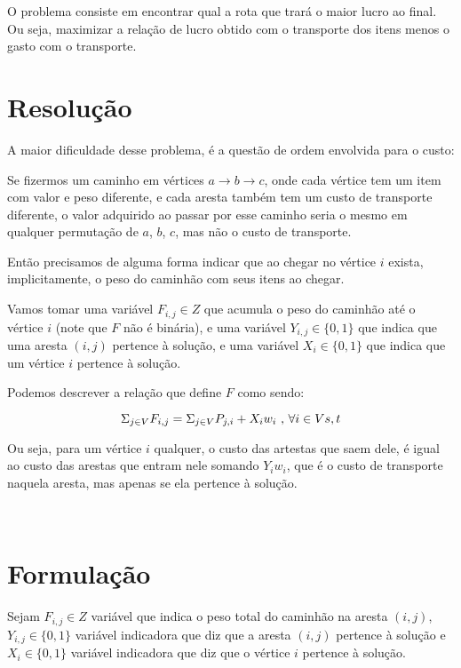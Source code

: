 \documentclass[conference]{IEEEtran}
\begin{document}
    O problema consiste em encontrar qual a rota que trará o maior lucro ao final. Ou seja, maximizar a relação de lucro obtido com o transporte dos itens menos o gasto com o transporte.

\section {Resolução}

    A maior dificuldade desse problema, é a questão de ordem envolvida para o custo:

    Se fizermos um caminho em vértices $a \rightarrow b \rightarrow c$, onde cada vértice tem um item com valor e peso diferente, e cada aresta também tem um custo de transporte diferente, o valor adquirido ao passar por esse caminho seria o mesmo em qualquer permutação de $a$, $b$, $c$, mas não o custo de transporte.

    Então precisamos de alguma forma indicar que ao chegar no vértice $i$ exista, implicitamente, o peso do caminhão com seus itens ao chegar.

    Vamos tomar uma variável $F_{i,j} \in Z$ que acumula o peso do caminhão até o vértice $i$ (note que $F$ não é binária), e uma variável $Y_{i,j} \in \{0,1\}$ que indica que uma aresta $(i,j)$ pertence à solução, e uma variável $X_i \in \{0,1\}$ que indica que um vértice $i$ pertence à solução.

    Podemos descrever a relação que define $F$ como sendo:

    \begin{equation}
        \Sigma_{j \in V}F_{i,j} = \Sigma_{j \in V} P_{j,i} + X_i w_i \text{ , } \forall i \in V \\ {s,t}
    \end{equation}

    Ou seja, para um vértice $i$ qualquer, o custo das artestas que saem dele, é igual ao custo das arestas que entram nele somando $Y_i w_i$, que é o custo de transporte naquela aresta, mas apenas se ela pertence à solução.

\\

\section {Formulação}

    Sejam $F_{i,j} \in Z$ variável que indica o peso total do caminhão na aresta $(i,j)$, $Y_{i,j} \in \{0, 1\}$ variável indicadora que diz que a aresta $(i,j)$ pertence à solução e $X_i \in \{0, 1\}$ variável indicadora que diz que o vértice $i$ pertence à solução.
\end{document}
